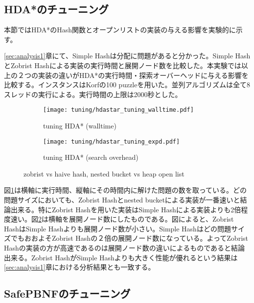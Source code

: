 \documentclass[uplatex]{jsarticle}
\begin{document}
\subsection{HDA*のチューニング}
\label{sec:hdastar_tuning}

本節ではHDA*のHash関数とオープンリストの実装の与える影響を実験的に示す。

\ref{sec:analysis1}章にて、Simple Hashは分配に問題があると分かった。Simple HashとZobrist Hashによる実装の実行時間と展開ノード数を比較した。本実験では以上の２つの実装の違いがHDA*の実行時間・探索オーバーヘッドに与える影響を比較する。インスタンスはKorfの100 puzzleを用いた\cite{Korf1985depth}。並列アルゴリズムは全て8スレッドの実行による。実行時間の上限は2000秒とした。
\newline

\begin{figure}[h]
	\centering
	\begin{subfigure}{0.4\columnwidth}
		\texttt{[image: tuning/hdastar\_tuning\_walltime.pdf]}
		\caption{tuning HDA* (walltime)}
		\label{fig:hdastar_tuning_walltime}
	\end{subfigure}
	\begin{subfigure}{0.4\columnwidth}
		\texttt{[image: tuning/hdastar\_tuning\_expd.pdf]}
		\caption{tuning HDA* (search overhead)}
		\label{fig:hdastar_tuning_expd}
	\end{subfigure}
	\caption{zobrist vs haive hash, nested bucket vs heap open list}
	\label{fig:hdastar_tuning}
\end{figure}

図\ref{fig:hdastar_tuning_walltime}は横軸に実行時間、縦軸にその時間内に解けた問題の数を取っている。どの問題サイズにおいても、Zobrist Hashとnested bucketによる実装が一番速いと結論出来る。特にZobrist Hashを用いた実装はSimple Hashによる実装よりも2倍程度速い。図\ref{fig:hdastar_tuning_expd}は横軸を展開ノード数にしたものである。図によると、Zobrist HashはSimple Hashよりも展開ノード数が小さい。Simple Hashはどの問題サイズでもおおよそZobrist Hashの２倍の展開ノード数になっている。よってZobrist Hashの実装の方が高速であるのは展開ノード数の違いによるものであると結論出来る。Zobrist HashがSimple Hashよりも大きく性能が優れるという結果は\ref{sec:analysis1}章における分析結果とも一致する。


\subsection{SafePBNFのチューニング}
\label{sec:pbnf_tuning}
\end{document}
